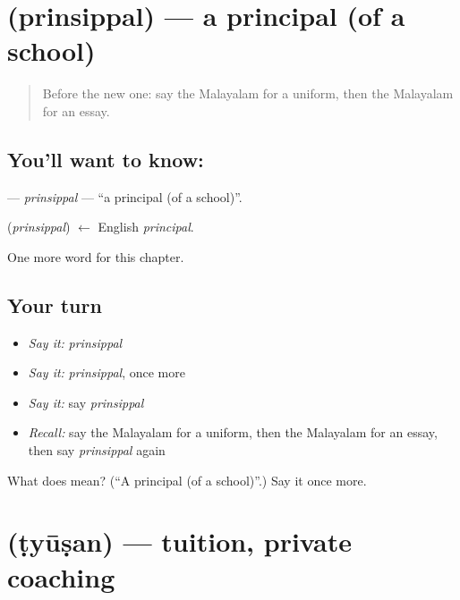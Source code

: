 \section[\texorpdfstring{\ml{പ്രിൻസിപ്പൽ} (prinsippal)}{പ്രിൻസിപ്പൽ (prinsippal)}]{ (prinsippal) — a principal (of a school)}

\label{lesson:ML-C337-prinsippal}



\begin{quote}
Before the new one: say the Malayalam for a uniform, then the Malayalam for an essay.
\end{quote}

\subsection*{You'll want to know: }
\textbf{} — \emph{prinsippal} — \textquotedblleft{}a principal (of a school)\textquotedblright{}.

\begin{cousinweb}
\textbf{} (\emph{prinsippal}) $\leftarrow$ English \emph{principal}.
\end{cousinweb}

\begin{grammarlens}[title={What you've built}]
One more word for this chapter.
\end{grammarlens}

\subsection*{Your turn}
\begin{itemize}
\raggedright
  \item \emph{Say it:} \emph{prinsippal}
  \item \emph{Say it:} \emph{prinsippal}, once more
  \item \emph{Say it:} say \emph{prinsippal}
  \item \emph{Recall:} say the Malayalam for a uniform, then the Malayalam for an essay, then say \emph{prinsippal} again
\end{itemize}

\begin{tcolorbox}[breakable,colback=teal!4,colframe=teal!35!black,title={Before you move on}]
What does  mean? (\textquotedblleft{}A principal (of a school)\textquotedblright{}.) Say it once more.
\end{tcolorbox}
\section[\texorpdfstring{\ml{ട്യൂഷൻ} (ṭyūṣan)}{ട്യൂഷൻ (ṭyūṣan)}]{ (ṭyūṣan) — tuition, private coaching}

